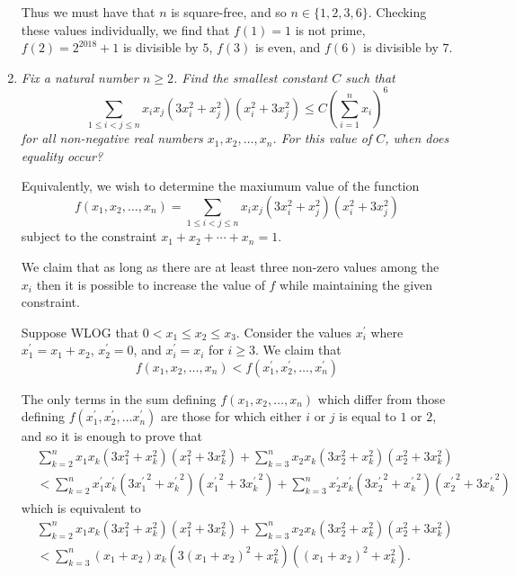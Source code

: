 \documentclass{article}
\begin{document}
\begin{enumerate}[1.]
Thus we must have that $n$ is square-free, and so $n \in \{1, 2, 3, 6\}$. Checking these values individually, we find that $f(1) = 1$ is not prime, $f(2) = 2^{2018} + 1$ is divisible by $5$, $f(3)$ is even, and $f(6)$ is divisible by $7$.


\vspace{6pt}
\item %
\textit{Fix a natural number $n \geq 2$. Find the smallest constant $C$ such that
\[
	 \sum_{1 \leq i < j \leq n} x_i x_j (3x_i^2 + x_j^2)(x_i^2 + 3x_j^2) \leq C {\left( \sum_{i = 1}^{n} x_i \right)}^6
\]
for all non-negative real numbers $x_1, x_2, \dots, x_n$. For this value of $C$, when does equality occur?}

Equivalently, we wish to determine the maxiumum value of the function
\[
	f(x_1, x_2, \dots, x_n) = \sum_{1 \leq i < j \leq n} x_i x_j (3x_i^2 + x_j^2)(x_i^2 + 3x_j^2)
\]
subject to the constraint $x_1 + x_2 + \cdots + x_n = 1$.

We claim that as long as there are at least three non-zero values among the $x_i$ then it is possible to increase the value of $f$ while maintaining the given constraint.

Suppose WLOG that $0 < x_1 \leq x_2 \leq x_3$. Consider the values $x_i^\prime$ where $x_1^\prime = x_1 + x_2$, $x_2^\prime = 0$, and $x_i^\prime = x_i$ for $i \geq 3$. We claim that
\[
	f(x_1, x_2, \dots, x_n) < f(x_1^\prime, x_2^\prime, \dots, x_n^\prime)
\]

The only terms in the sum defining $f(x_1, x_2, \dots, x_n)$ which differ from those defining $f(x_1^\prime, x_2^\prime, \dots x_n^\prime)$ are those for which either $i$ or $j$ is equal to $1$ or $2$, and so it is enough to prove that
\begin{align*}
	& \sum_{k = 2}^{n} x_1 x_k (3x_1^2 + x_k^2)(x_1^2 + 3x_k^2) + \sum_{k = 3}^{n} x_2 x_k (3x_2^2 + x_k^2)(x_2^2 + 3x_k^2) \\
	& <	\sum_{k = 2}^{n} x_1^\prime x_k^\prime (3{x_1^\prime}^2 + {x_k^\prime}^2)({x_1^\prime}^2 + 3{x_k^\prime}^2) + \sum_{k = 3}^{n} x_2^\prime x_k^\prime (3{x_2^\prime}^2 + {x_k^\prime}^2)({x_2^\prime}^2 + 3{x_k^\prime}^2)
\end{align*}
which is equivalent to
\begin{align*}
	& \sum_{k = 2}^{n} x_1 x_k (3x_1^2 + x_k^2)(x_1^2 + 3x_k^2) + \sum_{k = 3}^{n} x_2 x_k (3x_2^2 + x_k^2)(x_2^2 + 3x_k^2) \\
	& < \sum_{k = 3}^{n} (x_1 + x_2) x_k (3{(x_1 + x_2)}^2 + x_k^2)({(x_1 + x_2)}^2 + x_k^2).
\end{align*}


\end{enumerate}
\end{document}

